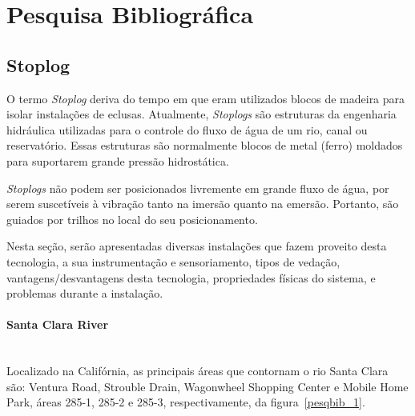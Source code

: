 

\section{Pesquisa Bibliográfica}
\label{pesqbib}
\subsection{Stoplog}
O termo \emph{Stoplog} deriva do tempo em que eram utilizados blocos de madeira para
isolar instalações de eclusas. Atualmente, \emph{Stoplogs} são estruturas da engenharia
hidráulica utilizadas para o controle do fluxo de água de um rio, canal ou
reservatório. Essas estruturas são normalmente blocos de metal (ferro) moldados
para suportarem grande pressão hidrostática. 

\emph{Stoplogs} não podem ser posicionados livremente em grande fluxo de água, por
serem suscetíveis à vibração tanto na imersão quanto na emersão. Portanto, são guiados por trilhos no local do seu posicionamento.

Nesta seção, serão apresentadas diversas instalações que fazem proveito desta tecnologia, a sua instrumentação e sensoriamento, tipos de vedação, vantagens/desvantagens desta tecnologia, propriedades físicas do sistema, e problemas durante a instalação.  

\paragraph{Santa Clara River}\mbox{}\\
Localizado na Califórnia, as principais áreas que contornam o rio Santa Clara
são: Ventura Road, Strouble Drain, Wagonwheel Shopping Center e Mobile Home
Park, áreas 285-1, 285-2 e 285-3, respectivamente, da figura~\ref{pesqbib_1}.

